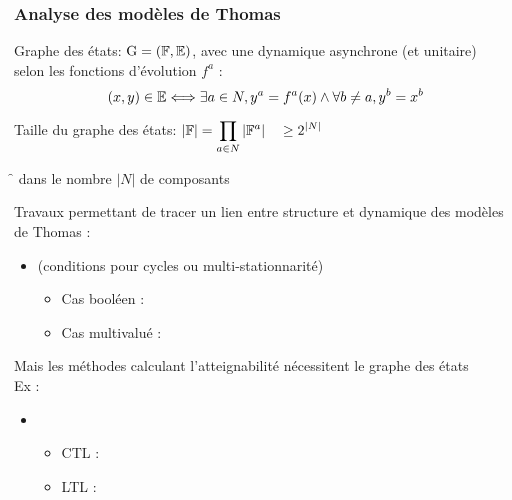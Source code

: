 \begin{frame}[c]
  \frametitle{Analyse des modèles de Thomas}

Graphe des états: $\mathrm{G} = (\mathbb{F}, \mathbb{E})$, avec une dynamique asynchrone (et unitaire)\\
selon les fonctions d'évolution $f^a$ :
$$(x, y) \in \mathbb{E} \Longleftrightarrow \exists a \in N, y^a = f^a(x) \wedge \forall b \neq a, y^b = x^b$$


\pause
\medskip
Taille du graphe des états: \quad $\displaystyle|\mathbb{F}| = \prod_{a \in N} |\mathbb{F}^a| \quad\geq 2^{|N|}$

\medskip
\f {} dans le nombre $|N|$ de composants

\pause
\bigskip
Travaux permettant de tracer un lien entre structure et dynamique des modèles de Thomas :
\begin{itemize}
  \item {} (conditions pour cycles ou multi-stationnarité)
  \begin{itemize}
    \item Cas booléen : 
    \item Cas multivalué : 
  \end{itemize}
\end{itemize}

\pause
\medskip
Mais les méthodes calculant l'atteignabilité nécessitent le graphe des états\\
Ex : 
\begin{itemize}
  \item {}
  \begin{itemize}
    \item CTL : 
    \item LTL : 
  \end{itemize}
\end{itemize}
\end{frame}
